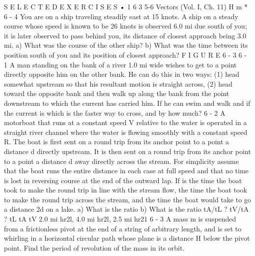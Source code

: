 \documentclass[10pt,oneside]{article}
\begin{document}
S E L E C T E D  E X E R C I S E S • 1 6 3 5-6 Vectors (Vol. I, Ch. 11) H m \emph{ } * 6 - 4 You are on a ship traveling steadily east at 15 knots. A ship on a steady course whose speed is known to be 26 knots is observed 6.0 mi due south of you; it is later observed to pass behind you, its distance of closest approach being 3.0 mi. a) What was the course of the other ship? b) What was the time between its position south of you and its position of closest approach? F I G U R E  6 - 3 \emph{ } 6 - 1 A man standing on the bank of a river 1.0 mi wide wishes to get to a point directly opposite him on the other bank. He can do this in two ways: (1) head somewhat upstream so that his resultant motion is straight across, (2) head toward the opposite bank and then walk up along the bank from the point downstream to which the current has carried him. If he can swim and walk and if the current is which is the faster way to cross, and by how much? \emph{ } 6 - 2 A motorboat that runs at a constant speed V relative to the water is operated in a straight river channel where the water is flowing smoothly with a constant speed R. The boat is first sent on a round trip from its anchor point to a point a distance d directly upstream. It is then sent on a round trip from its anchor point to a point a distance d away directly across the stream. For simplicity assume that the boat runs the entire distance in each case at full speed and that no time is lost in reversing course at the end of the outward lap. If is the time the boat took to make the round trip in line with the stream flow, the time the boat took to make the round trip across the stream, and the time the boat would take to go a distance 2d on a lake. a) What is the ratio b) What is the ratio tA/tL ? tV/tA ? tL tA tV 2.0 mi hr2l, 4.0 mi hr2l, 2.5 mi hr21 \emph{ } 6 - 3 A mass m is suspended from a frictionless pivot at the end of a string of arbitrary length, and is set to whirling in a horizontal circular path whose plane is a distance H below the pivot point. Find the period of revolution of the mass in its orbit.\par
\end{document}
